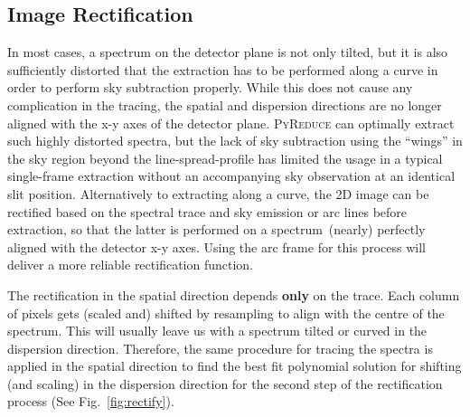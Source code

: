 \documentclass[twocolumn, linenumbers]{aastex631}
\begin{document}
\subsection{Image Rectification}
In most cases, a spectrum on the detector plane is not only tilted,
but it is also sufficiently distorted that the extraction has to be
performed along a curve in order to perform sky subtraction properly.
While this does not cause any complication in the tracing, the
spatial and dispersion directions are no longer aligned with the x-y
axes of the detector plane. \textsc{PyReduce} can optimally extract
such highly distorted spectra, but the lack of sky subtraction using
the ``wings'' in the sky region beyond the line-spread-profile has
limited the usage in a typical single-frame extraction without an
accompanying sky observation at an identical slit position.
Alternatively to extracting along a curve, the 2D image can be
rectified based on the spectral trace and sky emission or arc lines
before extraction, so that the latter is performed on a spectrum~(nearly)
perfectly aligned with the detector x-y axes. Using the arc frame for
this process will deliver a more reliable rectification function.

The rectification in the spatial direction depends \textbf{only}
on the trace. Each column of pixels gets (scaled and) shifted by
resampling to align with the centre of the spectrum. This will
usually leave us with a spectrum tilted or curved in the dispersion
direction. Therefore, the same procedure for tracing the spectra is
applied in the spatial direction to find the best fit polynomial
solution for shifting (and scaling) in the dispersion direction for
the second step of the rectification process (See Fig.~\ref{fig:rectify}).
\end{document}
